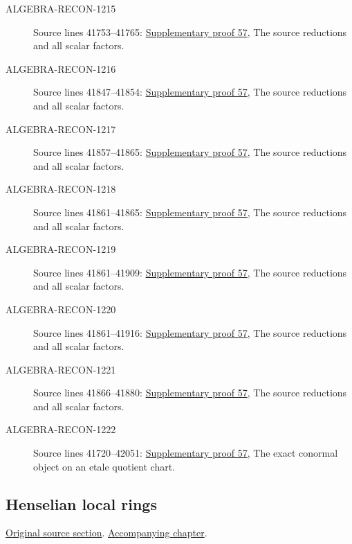 \begin{description}
\item[ALGEBRA-RECON-1215] Source lines 41753--41765: \hyperlink{algebra_local_unramified_notes_20260929}{Supplementary proof 57}, The source reductions and all scalar factors.
\item[ALGEBRA-RECON-1216] Source lines 41847--41854: \hyperlink{algebra_local_unramified_notes_20260929}{Supplementary proof 57}, The source reductions and all scalar factors.
\item[ALGEBRA-RECON-1217] Source lines 41857--41865: \hyperlink{algebra_local_unramified_notes_20260929}{Supplementary proof 57}, The source reductions and all scalar factors.
\item[ALGEBRA-RECON-1218] Source lines 41861--41865: \hyperlink{algebra_local_unramified_notes_20260929}{Supplementary proof 57}, The source reductions and all scalar factors.
\item[ALGEBRA-RECON-1219] Source lines 41861--41909: \hyperlink{algebra_local_unramified_notes_20260929}{Supplementary proof 57}, The source reductions and all scalar factors.
\item[ALGEBRA-RECON-1220] Source lines 41861--41916: \hyperlink{algebra_local_unramified_notes_20260929}{Supplementary proof 57}, The source reductions and all scalar factors.
\item[ALGEBRA-RECON-1221] Source lines 41866--41880: \hyperlink{algebra_local_unramified_notes_20260929}{Supplementary proof 57}, The source reductions and all scalar factors.
\item[ALGEBRA-RECON-1222] Source lines 41720--42051: \hyperlink{algebra_local_unramified_notes_20260929}{Supplementary proof 57}, The exact conormal object on an etale quotient chart.
\end{description}

\subsection{Henselian local rings}
\hypertarget{algebra-source-section-henselian}{}
\noindent\href{https://github.com/stacks/stacks-project/blob/a04446e57ec1fbc252a871afcec7752fb2807b14/algebra.tex\#L42062}{Original source section}. \href{algebra.pdf\#nameddest=section-henselian}{Accompanying chapter}.

